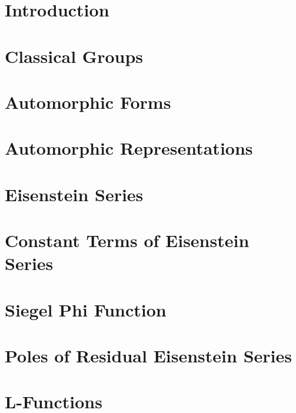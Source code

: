\documentclass[12pt, openany]{book}
\numberwithin{equation}{section}
\begin{document}
\chapter*{Introduction}


\tableofcontents
{}

\chapter{Classical Groups}

\chapter{Automorphic Forms}

\chapter{Automorphic Representations}

\chapter{Eisenstein Series}

\chapter{Constant Terms of Eisenstein Series}

\chapter{Siegel Phi Function}

\chapter{Poles of Residual Eisenstein Series}



    \appendix
\chapter{L-Functions}



\listoftodos



\newpage


\end{document}
